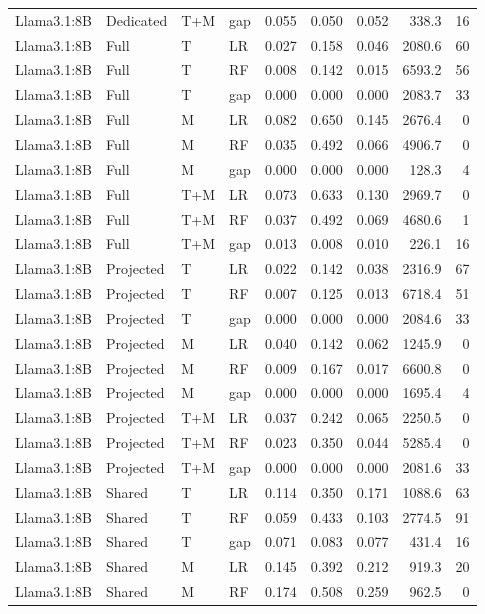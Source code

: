 \begin{longtable}{@{}P{.14\textwidth}P{.13\textwidth}P{.05\textwidth}P{.21\textwidth}rrrrr@{}}
Llama3.1:8B & Dedicated & T+M & gap & 0.055 & 0.050 & 0.052 & 338.3 & 16 \\
Llama3.1:8B & Full & T & LR & 0.027 & 0.158 & 0.046 & 2080.6 & 60 \\
Llama3.1:8B & Full & T & RF & 0.008 & 0.142 & 0.015 & 6593.2 & 56 \\
Llama3.1:8B & Full & T & gap & 0.000 & 0.000 & 0.000 & 2083.7 & 33 \\
Llama3.1:8B & Full & M & LR & 0.082 & 0.650 & 0.145 & 2676.4 & 0 \\
Llama3.1:8B & Full & M & RF & 0.035 & 0.492 & 0.066 & 4906.7 & 0 \\
Llama3.1:8B & Full & M & gap & 0.000 & 0.000 & 0.000 & 128.3 & 4 \\
Llama3.1:8B & Full & T+M & LR & 0.073 & 0.633 & 0.130 & 2969.7 & 0 \\
Llama3.1:8B & Full & T+M & RF & 0.037 & 0.492 & 0.069 & 4680.6 & 1 \\
Llama3.1:8B & Full & T+M & gap & 0.013 & 0.008 & 0.010 & 226.1 & 16 \\
Llama3.1:8B & Projected & T & LR & 0.022 & 0.142 & 0.038 & 2316.9 & 67 \\
Llama3.1:8B & Projected & T & RF & 0.007 & 0.125 & 0.013 & 6718.4 & 51 \\
Llama3.1:8B & Projected & T & gap & 0.000 & 0.000 & 0.000 & 2084.6 & 33 \\
Llama3.1:8B & Projected & M & LR & 0.040 & 0.142 & 0.062 & 1245.9 & 0 \\
Llama3.1:8B & Projected & M & RF & 0.009 & 0.167 & 0.017 & 6600.8 & 0 \\
Llama3.1:8B & Projected & M & gap & 0.000 & 0.000 & 0.000 & 1695.4 & 4 \\
Llama3.1:8B & Projected & T+M & LR & 0.037 & 0.242 & 0.065 & 2250.5 & 0 \\
Llama3.1:8B & Projected & T+M & RF & 0.023 & 0.350 & 0.044 & 5285.4 & 0 \\
Llama3.1:8B & Projected & T+M & gap & 0.000 & 0.000 & 0.000 & 2081.6 & 33 \\
Llama3.1:8B & Shared & T & LR & 0.114 & 0.350 & 0.171 & 1088.6 & 63 \\
Llama3.1:8B & Shared & T & RF & 0.059 & 0.433 & 0.103 & 2774.5 & 91 \\
Llama3.1:8B & Shared & T & gap & 0.071 & 0.083 & 0.077 & 431.4 & 16 \\
Llama3.1:8B & Shared & M & LR & 0.145 & 0.392 & 0.212 & 919.3 & 20 \\
Llama3.1:8B & Shared & M & RF & 0.174 & 0.508 & 0.259 & 962.5 & 0 \\

\end{longtable}
